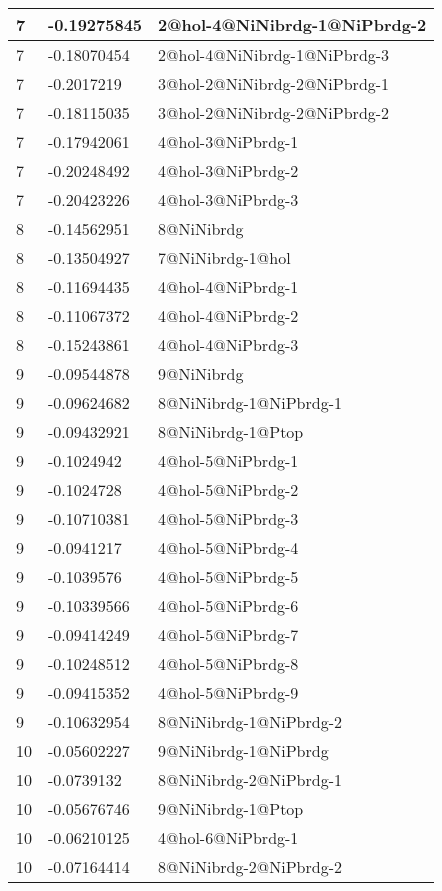 \begin{center}
\begin{longtable}{|l|l|l|}
7 & -0.19275845 & 2@hol-4@NiNibrdg-1@NiPbrdg-2 \\ \hline
7 & -0.18070454 & 2@hol-4@NiNibrdg-1@NiPbrdg-3 \\ \hline
7 & -0.2017219 & 3@hol-2@NiNibrdg-2@NiPbrdg-1 \\ \hline
7 & -0.18115035 & 3@hol-2@NiNibrdg-2@NiPbrdg-2 \\ \hline
7 & -0.17942061 & 4@hol-3@NiPbrdg-1 \\ \hline
7 & -0.20248492 & 4@hol-3@NiPbrdg-2 \\ \hline
7 & -0.20423226 & 4@hol-3@NiPbrdg-3 \\ \hline
8 & -0.14562951 & 8@NiNibrdg \\ \hline
8 & -0.13504927 & 7@NiNibrdg-1@hol \\ \hline
8 & -0.11694435 & 4@hol-4@NiPbrdg-1 \\ \hline
8 & -0.11067372 & 4@hol-4@NiPbrdg-2 \\ \hline
8 & -0.15243861 & 4@hol-4@NiPbrdg-3 \\ \hline
9 & -0.09544878 & 9@NiNibrdg \\ \hline
9 & -0.09624682 & 8@NiNibrdg-1@NiPbrdg-1 \\ \hline
9 & -0.09432921 & 8@NiNibrdg-1@Ptop \\ \hline
9 & -0.1024942 & 4@hol-5@NiPbrdg-1 \\ \hline
9 & -0.1024728 & 4@hol-5@NiPbrdg-2 \\ \hline
9 & -0.10710381 & 4@hol-5@NiPbrdg-3 \\ \hline
9 & -0.0941217 & 4@hol-5@NiPbrdg-4 \\ \hline
9 & -0.1039576 & 4@hol-5@NiPbrdg-5 \\ \hline
9 & -0.10339566 & 4@hol-5@NiPbrdg-6 \\ \hline
9 & -0.09414249 & 4@hol-5@NiPbrdg-7 \\ \hline
9 & -0.10248512 & 4@hol-5@NiPbrdg-8 \\ \hline
9 & -0.09415352 & 4@hol-5@NiPbrdg-9 \\ \hline
9 & -0.10632954 & 8@NiNibrdg-1@NiPbrdg-2 \\ \hline
10 & -0.05602227 & 9@NiNibrdg-1@NiPbrdg \\ \hline
10 & -0.0739132 & 8@NiNibrdg-2@NiPbrdg-1 \\ \hline
10 & -0.05676746 & 9@NiNibrdg-1@Ptop \\ \hline
10 & -0.06210125 & 4@hol-6@NiPbrdg-1 \\ \hline
10 & -0.07164414 & 8@NiNibrdg-2@NiPbrdg-2 \\ \hline

\end{longtable}
\end{center}
